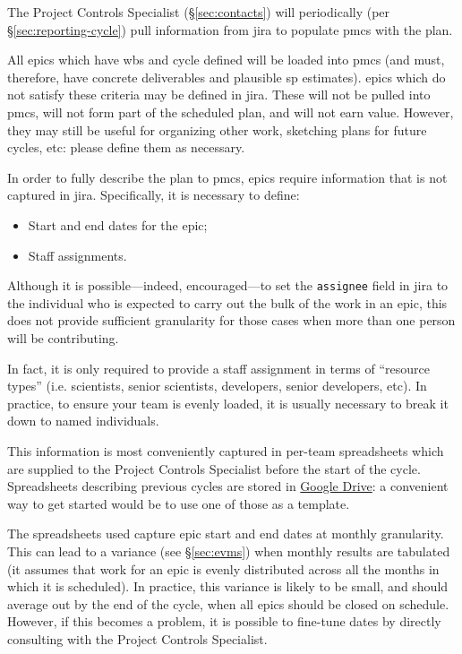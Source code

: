 The Project Controls Specialist (\S\ref{sec:contacts}) will periodically (per \S\ref{sec:reporting-cycle}) pull information from \gls{jira} to populate \gls{pmcs} with the plan.

All \glspl{epic} which have \gls{wbs} and \gls{cycle} defined will be loaded into \gls{pmcs} (and must, therefore, have concrete deliverables and plausible \gls{sp} estimates).
\Glspl{epic} which do not satisfy these criteria may be defined in \gls{jira}.
These will not be pulled into \gls{pmcs}, will not form part of the scheduled plan, and will not earn value.
However, they may still be useful for organizing other work, sketching plans for future \glspl{cycle}, etc: please define them as necessary.

In order to fully describe the plan to \gls{pmcs}, \glspl{epic} require information that is not captured in \gls{jira}.
Specifically, it is necessary to define:

\begin{itemize}
\item
  Start and end dates for the \gls{epic};
\item
  Staff assignments.
\end{itemize}

Although it is possible---indeed, encouraged---to set the \texttt{assignee} field in \gls{jira} to the individual who is expected to carry out the bulk of the work in an \gls{epic}, this does not provide sufficient granularity for those cases when more than one person will be contributing.

In fact, it is only required to provide a staff assignment in terms of ``resource types'' (i.e. scientists, senior scientists, developers, senior developers, etc).
In practice, to ensure your team is evenly loaded, it is usually necessary to break it down to named individuals.

This information is most conveniently captured in per-team spreadsheets which are supplied to the Project Controls Specialist before the start of the \gls{cycle}.
Spreadsheets describing previous \glspl{cycle} are stored in \href{https://drive.google.com/drive/u/0/folders/0BxgFbTQURmr6TmxXSm5Dc1JJWk0}{Google Drive}: a convenient way to get started would be to use one of those as a template.

The spreadsheets used capture \gls{epic} start and end dates at monthly granularity.
This can lead to a variance (see \S\ref{sec:evms}) when monthly results are tabulated (it assumes that work for an \gls{epic} is evenly distributed across all the months in which it is scheduled).
In practice, this variance is likely to be small, and should average out by the end of the \gls{cycle}, when all \glspl{epic} should be closed on schedule.
However, if this becomes a problem, it is possible to fine-tune dates by directly consulting with the Project Controls Specialist.

